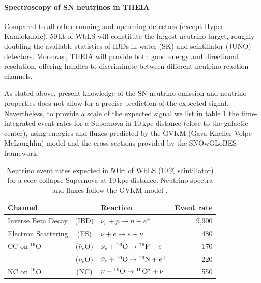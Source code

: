 \paragraph{Spectroscopy of SN neutrinos in THEIA}

Compared to all other running and upcoming detectors (except Hyper-Kamiokande), 50\,kt of WbLS will constitute the largest neutrino target, roughly doubling the available statistics of IBDs in water (SK) and scintillator (JUNO) detectors. Moreover, THEIA will provide both good energy and directional resolution, offering handles to discriminate between different neutrino reaction channels.

As stated above, present knowledge of the SN neutrino emission and neutrino properties does not allow for a precise prediction of the expected signal. Nevertheless, to provide a scale of the expected signal we list in table \ref{tab:snrates} the time-integrated event rates for a Supernova in 10\,kpc distance (close to the galactic center), using energies and fluxes predicted by the GVKM (Gava-Kneller-Volpe-McLaughlin) model \cite{Gava:2009pj} and the cross-sections provided by the SNOwGLoBES framework.

\begin{table}[h!]
\centering
\begin{tabular}{lclr}
\hline
Channel & & Reaction & Event rate \\
\hline
Inverse Beta Decay & (IBD) & $\bar\nu_e+p\to n+e^+$ & 9,900 \\
 Electron Scattering & (ES) &$\nu+e \to e+\nu$ & 480 \\
 CC on $^{16}$O & ($\bar\nu_e$O) & $\nu_e+ {^{16}{\rm O}} \to  {^{16}{\rm F}}+e^-$ & 170 \\
 & ($\nu_e$O) & $\bar\nu_e+ {^{16}{\rm O}} \to  {^{16}{\rm N}}+e^+$ & 220 \\
NC on $^{16}$O & (NC) &  $\nu + {^{16}{\rm O}} \to  {^{16}{\rm O}^*}+\nu$ & 550 \\
\hline
\end{tabular}
\caption{Neutrino event rates expected in 50\,kt of WbLS (10\,\% scintillator) for a core-collapse Supernova at 10\,kpc distance. Neutrino spectra and fluxes follow the GVKM model \cite{Gava:2009pj}.}
\label{tab:snrates}
\end{table}

